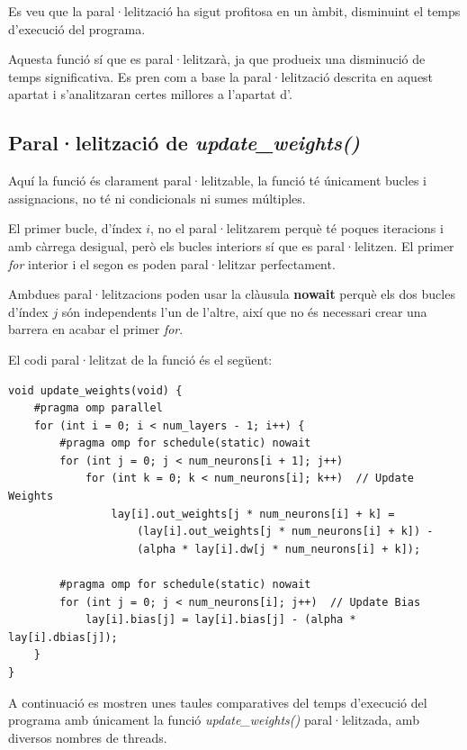 \documentclass{article}
\begin{document}
Es veu que la paral·lelització ha sigut profitosa en un àmbit, disminuint el temps d'execució del programa.

Aquesta funció sí que es paral·lelitzarà, ja que produeix una disminució de temps significativa. Es pren com a base la paral·lelització descrita en aquest apartat i s'analitzaran certes millores a l'apartat d'\texttt{}.

\subsection{Paral·lelització de \textit{update\_weights()}}

Aquí la funció és clarament paral·lelitzable, la funció té únicament bucles i assignacions, no té ni condicionals ni sumes múltiples.

El primer bucle, d'índex $i$, no el paral·lelitzarem perquè té poques iteracions i amb càrrega desigual, però els bucles interiors sí que es paral·lelitzen. El primer \textit{for} interior i el segon es poden paral·lelitzar perfectament. 

Ambdues paral·lelitzacions poden usar la clàusula \textbf{nowait} perquè els dos bucles d'índex $j$ són independents l'un de l'altre, així que no és necessari crear una barrera en acabar el primer \textit{for}.

El codi paral·lelitzat de la funció és el següent:
\begin{lstlisting}
void update_weights(void) {
    #pragma omp parallel
    for (int i = 0; i < num_layers - 1; i++) {
        #pragma omp for schedule(static) nowait
        for (int j = 0; j < num_neurons[i + 1]; j++)
            for (int k = 0; k < num_neurons[i]; k++)  // Update Weights
                lay[i].out_weights[j * num_neurons[i] + k] =
                    (lay[i].out_weights[j * num_neurons[i] + k]) -
                    (alpha * lay[i].dw[j * num_neurons[i] + k]);

        #pragma omp for schedule(static) nowait
        for (int j = 0; j < num_neurons[i]; j++)  // Update Bias
            lay[i].bias[j] = lay[i].bias[j] - (alpha * lay[i].dbias[j]);
    }
}
\end{lstlisting}

A continuació es mostren unes taules comparatives del temps d'execució del programa amb únicament la funció \textit{update\_weights()} paral·lelitzada, amb diversos nombres de threads.
\end{document}
